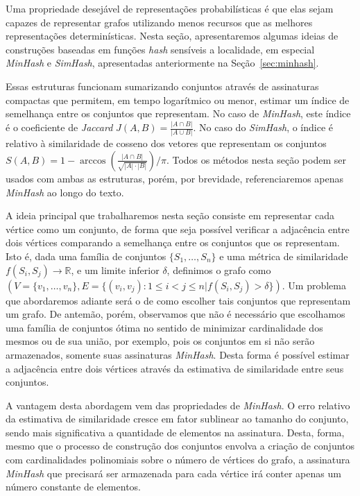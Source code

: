 Uma propriedade desejável de representações probabilísticas é que elas sejam capazes de representar grafos utilizando menos recursos que as melhores representações determinísticas. Nesta seção, apresentaremos algumas ideias de construções baseadas em funções \emph{hash} sensíveis a localidade, em especial \emph{MinHash} e \emph{SimHash}, apresentadas anteriormente na Seção~\ref{sec:minhash}.

Essas estruturas funcionam sumarizando conjuntos através de assinaturas compactas que permitem, em tempo logarítmico ou menor, estimar um índice de semelhança entre os conjuntos que representam. No caso de \emph{MinHash}, este índice é o coeficiente de \emph{Jaccard} $J(A, B) = \frac{|A \cap B|}{|A \cup B|}$. No caso do \emph{SimHash}, o índice é relativo à similaridade de cosseno dos vetores que representam os conjuntos $S(A, B) = 1 - \arccos \left( \frac{|A \cap B|}{\sqrt{|A| \cdot |B|}}\right)/\pi$. Todos os métodos nesta seção podem ser usados com ambas as estruturas, porém, por brevidade, referenciaremos apenas \emph{MinHash} ao longo do texto.

A ideia principal que trabalharemos nesta seção consiste em representar cada vértice como um conjunto, de forma que seja possível verificar a adjacência entre dois vértices comparando a semelhança entre os conjuntos que os representam. Isto é, dada uma família de conjuntos $\{S_1, \ldots, S_n\}$ e uma métrica de similaridade $f(S_i, S_j) \to \mathbb{R}$, e um limite inferior $\delta$, definimos o grafo como $(V = \{v_1, \ldots, v_n\}, E = \{(v_i, v_j) : 1 \leq i < j \leq n | f(S_i, S_j) > \delta\})$. Um problema que abordaremos adiante será o de como escolher tais conjuntos que representam um grafo. De antemão, porém, observamos que não é necessário que escolhamos uma família de conjuntos ótima no sentido de minimizar cardinalidade dos mesmos ou de sua união, por exemplo, pois os conjuntos em si não serão armazenados, somente suas assinaturas \emph{MinHash}. Desta forma é possível estimar a adjacência entre dois vértices através da estimativa de similaridade entre seus conjuntos. 

A vantagem desta abordagem vem das propriedades de \emph{MinHash}. O erro relativo da estimativa de similaridade cresce em fator sublinear ao tamanho do conjunto, sendo mais significativa a quantidade de elementos na assinatura. Desta, forma, mesmo que o processo de construção dos conjuntos envolva a criação de conjuntos com cardinalidades polinomiais sobre o número de vértices do grafo, a assinatura \emph{MinHash} que precisará ser armazenada para cada vértice irá conter apenas um número constante de elementos. 

